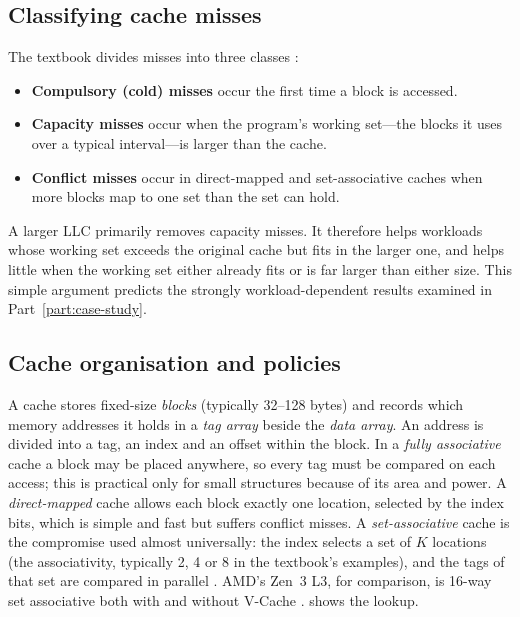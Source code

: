\subsection{Classifying cache misses}
\label{sec:miss-classes}

The textbook divides misses into three classes \cite[sec.~11.3.2]{sarangi2025basic}:
\begin{itemize}
  \item \textbf{Compulsory (cold) misses} occur the first time a block is accessed.
  \item \textbf{Capacity misses} occur when the program's working set---the blocks it uses over a typical interval---is larger than the cache.
  \item \textbf{Conflict misses} occur in direct-mapped and set-associative caches when more blocks map to one set than the set can hold.
\end{itemize}
A larger LLC primarily removes capacity misses. It therefore helps workloads whose working set exceeds the original cache but fits in the larger one, and helps little when the working set either already fits or is far larger than either size. This simple argument predicts the strongly workload-dependent results examined in Part~\ref{part:case-study}.

\subsection{Cache organisation and policies}
\label{sec:cache-org}
A cache stores fixed-size \emph{blocks} (typically 32--128 bytes) and records which memory addresses it holds in a \emph{tag array} beside the \emph{data array}. An address is divided into a tag, an index and an offset within the block. In a \emph{fully associative} cache a block may be placed anywhere, so every tag must be compared on each access; this is practical only for small structures because of its area and power. A \emph{direct-mapped} cache allows each block exactly one location, selected by the index bits, which is simple and fast but suffers conflict misses. A \emph{set-associative} cache is the compromise used almost universally: the index selects a set of $K$ locations (the associativity, typically 2, 4 or 8 in the textbook's examples), and the tags of that set are compared in parallel \cite[sec.~11.2.2]{sarangi2025basic}. AMD's Zen~3 L3, for comparison, is 16-way set associative both with and without V-Cache \cite[slides~19--20]{wuu2022vcache}.  shows the lookup.

